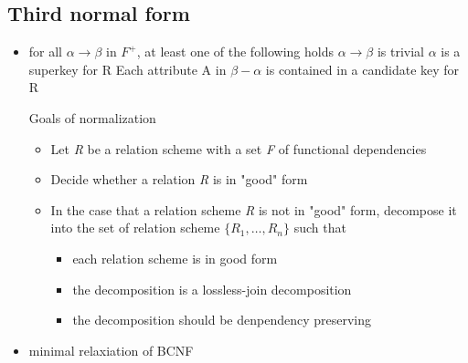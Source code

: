 \documentclass[11pt]{article}
\begin{document}
\subsection{Third normal form}
\label{sec-13-4}
\begin{itemize}
\item for all $\alpha\to\beta$ in $F^+$, at least one of the following holds
$\alpha\to\beta$ is trivial
$\alpha$ is a superkey for R
Each attribute A in $\beta - \alpha$ is contained in a candidate key for R
\item[{Goals of normalization}] \begin{itemize}
\item Let \emph{R} be a relation scheme with a set \emph{F} of functional dependencies
\item Decide whether a relation \emph{R} is in "good" form
\item In the case that a relation scheme \emph{R} is not in "good" form,
decompose it into the set of relation scheme $\{R_1,\dots,R_n\}$ such that
\begin{itemize}
\item each relation scheme is in good form
\item the decomposition is a lossless-join decomposition
\item the decomposition should be denpendency preserving
\end{itemize}
\end{itemize}
\item minimal relaxiation of BCNF
\end{itemize}
\end{document}
